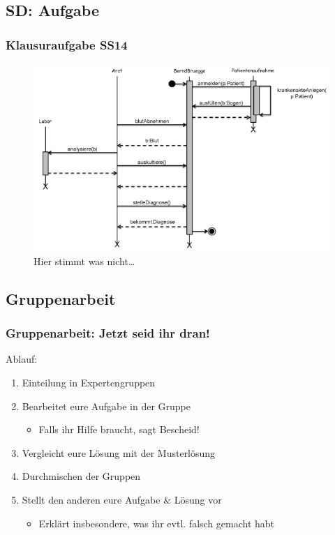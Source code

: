 \documentclass[18pt]{beamer}
\begin{document}
	\subsection{SD: Aufgabe}
	\begin{frame}
		\frametitle{Klausuraufgabe SS14}
			\begin{figure}
				\centering
				\includegraphics[scale=0.65]{./pics/tut2/sdtask.png}
				\caption{Hier stimmt was nicht\dots}
			\end{figure}
	\end{frame}

	\subsection{Gruppenarbeit}
	\begin{frame}
		\frametitle{Gruppenarbeit: Jetzt seid ihr dran!}
		Ablauf:
		\begin{enumerate}
			\item Einteilung in Expertengruppen
			\item Bearbeitet eure Aufgabe in der Gruppe
			\begin{itemize}
				\item Falls ihr Hilfe braucht, sagt Bescheid!
			\end{itemize}
			\item Vergleicht eure Lösung mit der Musterlösung 
			\item Durchmischen der Gruppen
			\item Stellt den anderen eure Aufgabe $\&$ Lösung vor
			\begin{itemize}
				\item Erklärt insbesondere, was ihr evtl. falsch gemacht habt
			\end{itemize}
		\end{enumerate}
	\end{frame}
	
\end{document}
